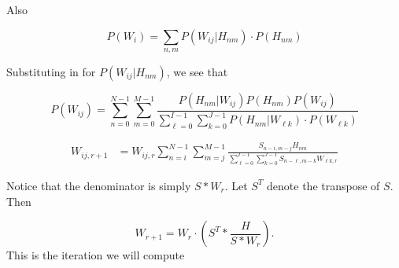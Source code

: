 \documentclass[11pt]{article}
\begin{document}
Also

\[
P(W_i) = \sum \limits_{n,m} P(W_{ij}|H_{nm})\cdot P(H_{nm})
\]

Substituting in for \(P(W_{ij} | H_{nm})\), we see that

\[
P(W_{ij}) = \sum \limits_{n=0}^{N-1} \sum \limits_{m=0}^{M-1} \frac{P(H_{nm} | W_{ij}) P(H_{nm}) P(W_{ij})}{ \sum \limits_{\ell = 0}^{I-1} \sum \limits_{k=0}^{J-1} P(H_{nm}|W_{\ell k}) \cdot P(W_{\ell k})}
\]

\begin{align*}
W_{ij,r+1} &= W_{ij,r} \sum \limits_{n=i}^{N-1} \sum \limits_{m=j}^{M-1} \frac{S_{n-i,m-j} H_{nm} }{ \sum \limits_{\ell = 0}^{I-1} \sum \limits_{k=0}^{J-1} S_{n-\ell,m-k}  W_{\ell k,r}}
\end{align*}

Notice that the denominator is simply \(S * W_r\). Let \(S^{T}\) denote
the transpose of \(S\). Then

\[W_{r+1} = W_{r}\cdot \left (S^{T} * \frac{H}{S*W_r} \right ).\] This
is the iteration we will compute
\end{document}
